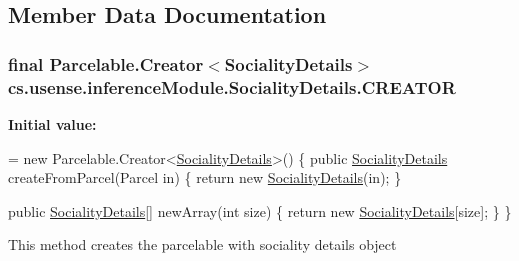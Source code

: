 \subsection{Member Data Documentation}
\hypertarget{classcs_1_1usense_1_1inference_module_1_1_sociality_details_aa5122152a10a67e49ec6c72c43aad81e}{}
\subsubsection[{C\+R\+E\+A\+T\+O\+R}]{\setlength{\rightskip}{0pt plus 5cm}final Parcelable.\+Creator$<${\bf Sociality\+Details}$>$ cs.\+usense.\+inference\+Module.\+Sociality\+Details.\+C\+R\+E\+A\+T\+O\+R\hspace{0.3cm}{\ttfamily [static]}}\label{classcs_1_1usense_1_1inference_module_1_1_sociality_details_aa5122152a10a67e49ec6c72c43aad81e}
{\bfseries Initial value\+:}
\begin{DoxyCode}
= \textcolor{keyword}{new} Parcelable.Creator<\hyperlink{classcs_1_1usense_1_1inference_module_1_1_sociality_details_a7df8f3e338de5ddcad39fb342c9a0d95}{SocialityDetails}>() \{
        \textcolor{keyword}{public} \hyperlink{classcs_1_1usense_1_1inference_module_1_1_sociality_details_a7df8f3e338de5ddcad39fb342c9a0d95}{SocialityDetails} createFromParcel(Parcel in) \{
            \textcolor{keywordflow}{return} \textcolor{keyword}{new} \hyperlink{classcs_1_1usense_1_1inference_module_1_1_sociality_details_a7df8f3e338de5ddcad39fb342c9a0d95}{SocialityDetails}(in);
        \}

        \textcolor{keyword}{public} \hyperlink{classcs_1_1usense_1_1inference_module_1_1_sociality_details_a7df8f3e338de5ddcad39fb342c9a0d95}{SocialityDetails}[] newArray(\textcolor{keywordtype}{int} size) \{
            \textcolor{keywordflow}{return} \textcolor{keyword}{new} \hyperlink{classcs_1_1usense_1_1inference_module_1_1_sociality_details_a7df8f3e338de5ddcad39fb342c9a0d95}{SocialityDetails}[size];
        \}
    \}
\end{DoxyCode}
This method creates the parcelable with sociality details object \hypertarget{classcs_1_1usense_1_1inference_module_1_1_sociality_details_ae31fcda774a26e9eaa301d1c849c862e}{}
